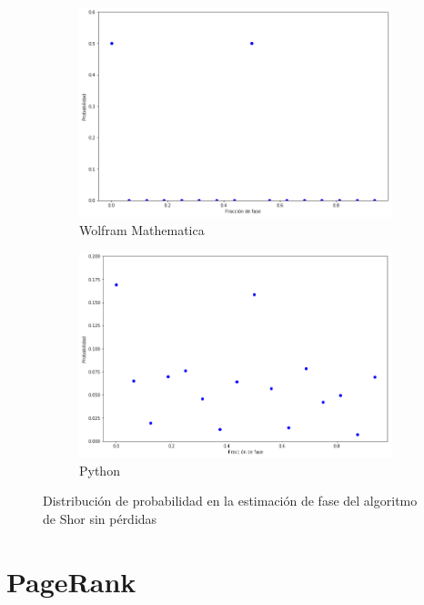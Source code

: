 \documentclass[xetex,mathserif,serif]{beamer}
\begin{document}
\begin{frame}
\begin{figure}[H]
    \centering
    \begin{subfigure}[m]{0.45\textwidth}
        \centering
        \includegraphics[width=0.9\linewidth]{img/ShorM8.png}
        \caption{Wolfram Mathematica}
    \end{subfigure}
    \begin{subfigure}[m]{0.45\textwidth}
        \centering
        \includegraphics[width=0.9\linewidth]{img/shor2lossless.png}
        \caption{Python}
    \end{subfigure}
    \caption[Distribución de probabilidad en la estimación de fase del algoritmo de Shor sin pérdidas]{Distribución de probabilidad en la estimación de fase del algoritmo de Shor sin pérdidas}
    \label{fig:shor8}
\end{figure}

\end{frame}

\section{PageRank}
\end{document}
